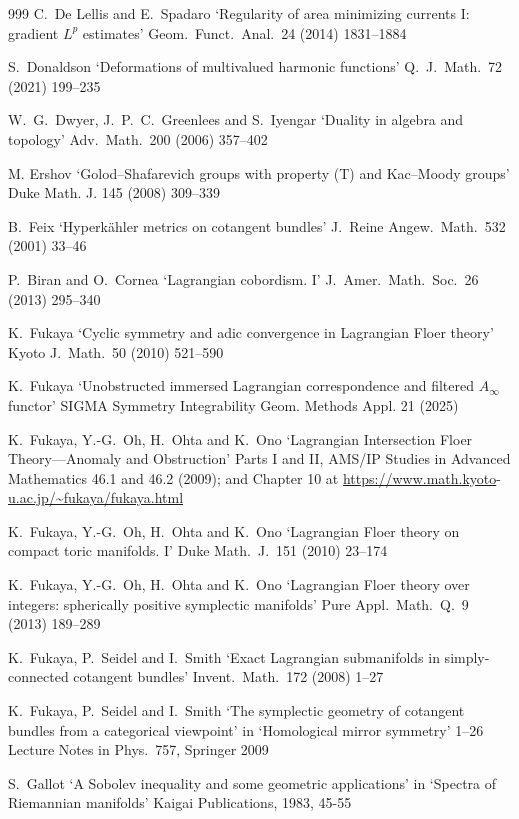 \documentclass{article}
\theoremstyle{plain}%
\theoremstyle{definition}
\numberwithin{equation}{section}
\numberwithin{figure}{section}
\def\iy{\infty}
\begin{document}
\begin{thebibliography}{999}
 C.\ De Lellis and E.\ Spadaro
`Regularity of area minimizing currents I: gradient $L^p$ estimates'
Geom.\ Funct.\ Anal.\ 24 (2014) 1831--1884

S.\ Donaldson
`Deformations of multivalued harmonic functions'
Q.\ J.\ Math.\ 72 (2021) 199--235


 W.\ G.\ Dwyer, J.\ P.\ C.\ Greenlees and S.\ Iyengar
`Duality in algebra and topology' Adv.\ Math.\ 200 (2006) 357--402

M. Ershov `Golod--Shafarevich groups with property (T) and Kac--Moody groups' Duke Math. J. 145 (2008) 309--339

 B.\ Feix
`Hyperk\"ahler metrics on cotangent bundles'
J.\ Reine Angew.\ Math.\ 532 (2001) 33--46

 P.\ Biran and O.\ Cornea `Lagrangian cobordism. I'
J.\ Amer.\ Math.\ Soc.\ 26 (2013) 295--340

 K.\ Fukaya
`Cyclic symmetry and adic convergence in Lagrangian Floer theory'
Kyoto J.\ Math.\ 50 (2010) 521--590


 K.\ Fukaya
`Unobstructed immersed Lagrangian correspondence and filtered $A_\iy$ functor'
SIGMA Symmetry Integrability Geom. Methods Appl. 21 (2025)

 K.\ Fukaya, Y.-G.\ Oh, H.\ Ohta and K.\ Ono
`Lagrangian Intersection Floer Theory---Anomaly and Obstruction'
Parts I and II, AMS/IP Studies in Advanced Mathematics 46.1 and 46.2 (2009);
and Chapter 10
at \url{https://www.math.kyoto}-\url{u.ac.jp/~fukaya/fukaya.html}

 K.\ Fukaya, Y.-G.\ Oh, H.\ Ohta and K.\ Ono
`Lagrangian Floer theory on compact toric manifolds. I' Duke Math.\ J.\ 151 (2010) 23--174

 K.\ Fukaya, Y.-G.\ Oh, H.\ Ohta and K.\ Ono
`Lagrangian Floer theory over integers: spherically positive symplectic manifolds'
Pure Appl.\ Math.\ Q.\
9 (2013) 189--289

 K.\ Fukaya, P.\ Seidel and I.\ Smith
`Exact Lagrangian submanifolds in simply-connected cotangent bundles'
Invent.\ Math.\ 172 (2008) 1--27

 K.\ Fukaya, P.\ Seidel and I.\ Smith
`The symplectic geometry of cotangent bundles from a categorical viewpoint' in `Homological mirror symmetry' 1--26 Lecture Notes in Phys.\ 757, Springer 2009


S.\ Gallot `A Sobolev inequality and some geometric applications' in `Spectra of Riemannian manifolds' Kaigai Publications, 1983, 45-55


\end{thebibliography}
\end{document}
